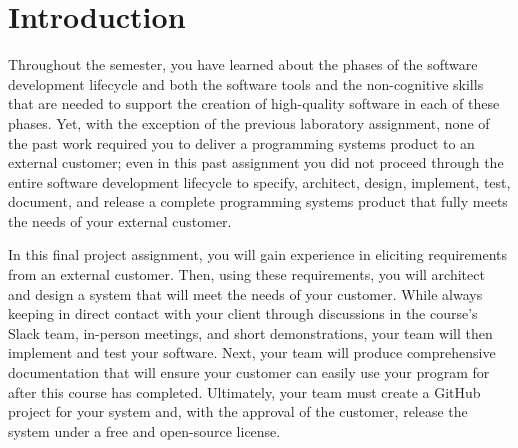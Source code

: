 

\usepackage[compact]{titlesec}

\usepackage[url=false,
    backend=biber,
    style=authoryear,
    doi=false,
    isbn=false,
    backref=false,
    dashed=false,                                   %
    maxnames=99,                                    %
    sorting=ydnt]{biblatex}                         %





\vspace*{-.1in}
\section*{Introduction}

\nocite{*}

Throughout the semester, you have learned about the phases of the software development lifecycle and both the software
tools and the non-cognitive skills that are needed to support the creation of high-quality software in each of these
phases. Yet, with the exception of the previous laboratory assignment, none of the past work required you to deliver a
programming systems product to an external customer; even in this past assignment you did not proceed through the entire
software development lifecycle to specify, architect, design, implement, test, document, and release a complete
programming systems product that fully meets the needs of your external customer.

In this final project assignment, you will gain experience in eliciting requirements from an external customer. Then,
using these requirements, you will architect and design a system that will meet the needs of your customer. While always
keeping in direct contact with your client through discussions in the course's Slack team, in-person meetings, and short
demonstrations, your team will then implement and test your software. Next, your team will produce comprehensive
documentation that will ensure your customer can easily use your program for after this course has completed.
Ultimately, your team must create a GitHub project for your system and, with the approval of the customer, release the
system under a free and open-source license.


